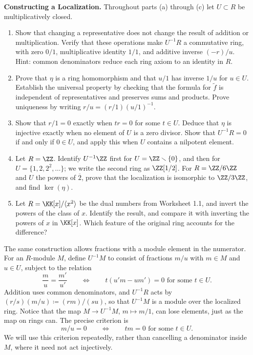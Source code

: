 \documentclass[12pt,reqno]{amsart}
\begin{document}
\begin{problems}
\item\label{t:localring} \textbf{Constructing a Localization.} Throughout parts (a) through (c) let $U\subset R$ be multiplicatively closed.
\begin{enumerate}
\item Show that changing a representative does not change the result of addition or multiplication. Verify that these operations make $U^{-1}R$ a commutative ring, with zero $0/1$, multiplicative identity $1/1$, and additive inverse $(-r)/u$. Hint: common denominators reduce each ring axiom to an identity in $R$.
\item Prove that $\eta$ is a ring homomorphism and that $u/1$ has inverse $1/u$ for $u\in U$. Establish the universal property by checking that the formula for $\widetilde f$ is independent of representatives and preserves sums and products. Prove uniqueness by writing $r/u=(r/1)(u/1)^{-1}$.
\item Show that $r/1=0$ exactly when $tr=0$ for some $t\in U$. Deduce that $\eta$ is injective exactly when no element of $U$ is a zero divisor. Show that $U^{-1}R=0$ if and only if $0\in U$, and apply this when $U$ contains a nilpotent element.
\item Let $R=\ZZ$. Identify $U^{-1}\ZZ$ first for $U=\ZZ\smallsetminus\{0\}$, and then for $U=\{1,2,2^2,\ldots\}$; we write the second ring as $\ZZ[1/2]$. For $R=\ZZ/6\ZZ$ and $U$ the powers of $\overline2$, prove that the localization is isomorphic to $\ZZ/3\ZZ$, and find $\ker(\eta)$.
\item Let $R=\KK[x]/\langle x^2\rangle$ be the dual numbers from Worksheet 1.1, and invert the powers of the class of $x$. Identify the result, and compare it with inverting the powers of $x$ in $\KK[x]$. Which feature of the original ring accounts for the difference?
\end{enumerate}
\end{problems}

\hrulefill

The same construction allows fractions with a module element in the numerator. For an $R$-module $M$, define $U^{-1}M$ to consist of fractions $m/u$ with $m\in M$ and $u\in U$, subject to the relation
\[
\frac mu=\frac{m'}{u'}\qquad\Longleftrightarrow\qquad t(u'm-um')=0\text{ for some }t\in U.
\]
Addition uses common denominators, and $U^{-1}R$ acts by $(r/s)(m/u)\coloneqq(rm)/(su)$, so that $U^{-1}M$ is a module over the localized ring. Notice that the map $M\to U^{-1}M$, $m\mapsto m/1$, can lose elements, just as the map on rings can. The precise criterion is
\[
m/u=0\qquad\Longleftrightarrow\qquad tm=0\text{ for some }t\in U.
\]
We will use this criterion repeatedly, rather than cancelling a denominator inside $M$, where it need not act injectively.
\end{document}
